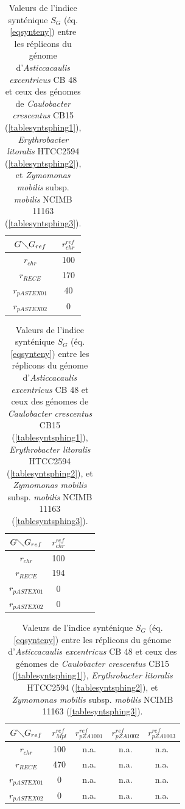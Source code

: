 \begin{table}[H]
	\begin{center}   
	\caption[Valeurs de l'indice synténique pour \textit{Asticcacaulis}]{Valeurs de l'indice synténique $S_{G}$ (éq. \ref{eqsynteny}) entre les réplicons du génome d'\textit{Asticcacaulis excentricus} CB 48 et ceux des génomes de \textit{Caulobacter crescentus} CB15 (\ref{tablesyntsphing1}), \textit{Erythrobacter litoralis} HTCC2594 (\ref{tablesyntsphing2}), et \textit{Zymomonas mobilis} subsp. \textit{mobilis} NCIMB 11163 (\ref{tablesyntsphing3}).}\label{tablesyntasticca}
	\begin{minipage}[t]{0.45\textwidth}
	\centering
	\label{tablesyntAstic1}
		\begin{tabular}{c|c}
		$G \diagdown G_{ref}$ & $r^{ref}_{chr}$\\
		\hline
		$r_{chr}$ & 100\\
		$ r_{RECE}$ & 170\\
		$r_{pASTEX01}$ & 40\\ 
		$r_{pASTEX02}$ & 0\\
		\end{tabular} 
	\end{minipage}
	\hspace{1cm}
	\begin{minipage}[t]{0.45\textwidth}
	\centering
	\label{tablesyntAstic2}
  		\begin{tabular}{c|cccc}
		$G \diagdown G_{ref}$ & $r^{ref}_{chr}$\\
		\hline
		$r_{chr}$ & 100\\
		$ r_{RECE}$ & 194\\
		$r_{pASTEX01}$ & 0\\ 
		$r_{pASTEX02}$ & 0\\
		\end{tabular}
	\end{minipage}
	\end{center} 

\begin{center}   
	\begin{minipage}[t]{0.45\textwidth}
	\centering
	\label{tablesyntAstic3}
	\hspace*{-1.5cm}
		\begin{tabular}{c|cccc}
		$G \diagdown G_{ref}$ & $r^{ref}_{Mpl}$ & $r^{ref}_{pZA1001}$ & $r^{ref}_{pZA1002}$ & $r^{ref}_{pZA1003}$\\
		\hline
		$r_{chr}$ & 100 & n.a. & n.a. & n.a. \\
		$ r_{RECE}$ & 470 & n.a. & n.a. & n.a. \\
		$r_{pASTEX01}$ & 0 & n.a. & n.a. & n.a. \\ 
		$r_{pASTEX02}$ & 0 & n.a. & n.a. &  n.a. \\
		\end{tabular}
	\end{minipage} 
\end{center} 
\end{table}   

